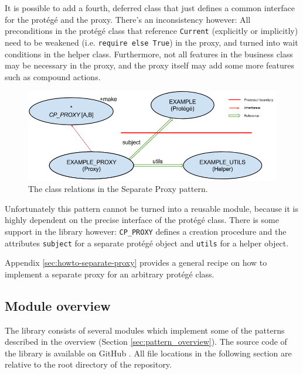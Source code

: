 It is possible to add a fourth, deferred class that just defines a common interface for the protégé and the proxy.
There's an inconsistency however: 
All preconditions in the protégé class that reference \lstinline!Current! (explicitly or implicitly) need to be weakened (i.e. \lstinline!require else True!) in the proxy, and turned into wait conditions in the helper class.
Furthermore, not all features in the business class may be necessary in the proxy, and the proxy itself may add some more features such as compound actions.

\begin{figure}[ht]
\label{fig:separate-proxy}
\includegraphics[width=\textwidth]{resources/separate_proxy.png}
\caption{The class relations in the Separate Proxy pattern.}
\end{figure}

Unfortunately this pattern cannot be turned into a reusable module, because it is highly dependent on the precise interface of the protégé class.
There is some support in the library however: 
\lstinline!CP_PROXY! defines a creation procedure and the attributes \lstinline!subject! for a separate protégé object and \lstinline!utils! for a helper object.

Appendix \ref{sec:howto-separate-proxy} provides a general recipe on how to implement a separate proxy for an arbitrary protégé class.

\subsection {Module overview}
\label{sec:module-overview}
The library consists of several modules which implement some of the patterns described in the overview (Section \ref{sec:pattern_overview}).
The source code of the library is available on GitHub \cite{web:repository}.
All file locations in the following section are relative to the root directory of the repository.


